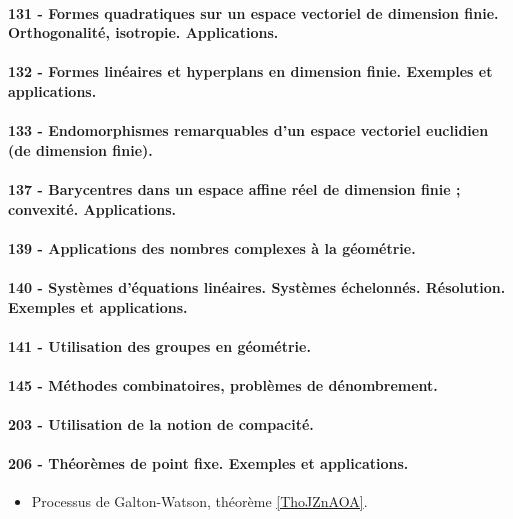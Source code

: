 \paragraph{131 - Formes quadratiques sur un espace vectoriel de dimension finie. Orthogonalité, isotropie. Applications.}
\paragraph{132 - Formes linéaires et hyperplans en dimension finie. Exemples et applications.}
\paragraph{133 - Endomorphismes remarquables d’un espace vectoriel euclidien (de dimension finie).}
\paragraph{137 - Barycentres dans un espace affine réel de dimension finie ; convexité. Applications.}
\paragraph{139 - Applications des nombres complexes à la géométrie.}
\paragraph{140 - Systèmes d’équations linéaires. Systèmes échelonnés. Résolution. Exemples et applications.}
\paragraph{141 - Utilisation des groupes en géométrie.}
\paragraph{145 - Méthodes combinatoires, problèmes de dénombrement.}
\paragraph{203 - Utilisation de la notion de compacité.}
\paragraph{206 - Théorèmes de point fixe. Exemples et applications.}
\begin{itemize}
    \item Processus de Galton-Watson, théorème \ref{ThoJZnAOA}.
\end{itemize}
